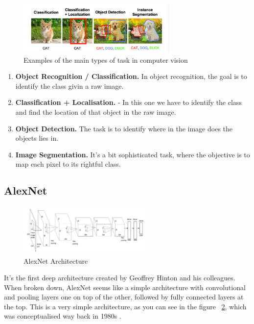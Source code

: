 \begin{figure}[H]
\centering
\includegraphics[width=0.7\textwidth]{./figures/Tasks-Architectures}
\caption{Examples of the main types of task in computer vision \cite{architectures}}
\label{fig:maintasks}
\end{figure}

\begin{enumerate}
\item \textbf{Object Recognition / Classification.} In object recognition, the goal is to identify the class givin a raw image.
\item \textbf{Classification + Localisation.} - In this one we have to identify the class and find the location of that object in the raw image.
\item \textbf{Object Detection.} The task is to identify where in the image does the objects lies in. 
\item \textbf{Image Segmentation.} It's a bit sophisticated task, where the objective is to map each pixel to its rightful class.
\end{enumerate}

\subsection[AlexNet]{AlexNet}

\begin{figure}[H]
\centering
\includegraphics[width=0.6\textwidth]{./figures/Alexnet}
\caption{AlexNet Architecture \cite{advances-architectures}}
\label{fig:alexnet}
\end{figure}

It's the first deep architecture created by Geoffrey Hinton and his colleagues. When broken down, AlexNet seems like a simple architecture with convolutional and pooling layers one on top of the other, followed by fully connected layers at the top. This is a very simple architecture, as you can see in the figure ~\ref{fig:alexnet}, which was conceptualised way back in 1980s  \cite{advances-architectures}.

